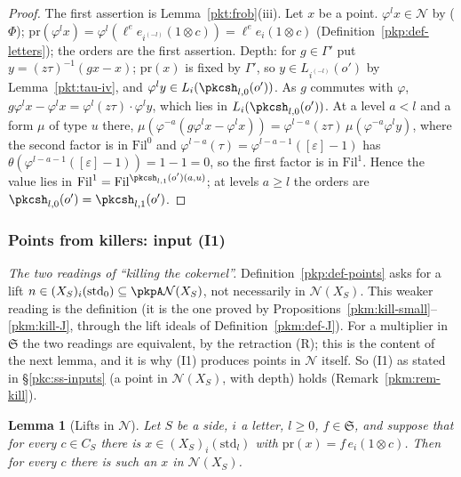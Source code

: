 \documentclass[10pt]{amsart}
\newtheorem{lemma}[theorem]{Lemma}
\theoremstyle{definition}
\theoremstyle{remark}
\begin{document}
\begin{proof}
The first assertion is Lemma~\ref{pkt:frob}(iii). Let $x$ be a point. $\varphi^lx\in\mathcal N$ by ($\Phi$);
$\mathrm{pr}(\varphi^lx)=\varphi^l(\ell^ee_{i^{(-l)}}(1\otimes c))=\ell^ee_i(1\otimes c)$
(Definition~\ref{pkp:def-letters}); the orders are the first assertion. Depth: for $g\in\Gamma'$ put $y=
(z\tau)^{-1}(gx-x)$; $\mathrm{pr}(x)$ is fixed by $\Gamma'$, so $y\in L_{i^{(-l)}}(o')$ by
Lemma~\ref{pkt:tau-iv}, and $\varphi^ly\in L_i(\pkcsh_{l,0}(o'))$. As $g$ commutes with $\varphi$,
$g\varphi^lx-\varphi^lx=\varphi^l(z\tau)\cdot\varphi^ly$, which lies in $L_i(\pkcsh_{l,0}(o'))$. At a level $a<l$
and a form $\mu$ of type $u$ there, $\mu(\varphi^{-a}(g\varphi^lx-\varphi^lx))=\varphi^{l-a}(z\tau)\,
\mu(\varphi^{-a}\varphi^ly)$, where the second factor is in $\mathrm{Fil}^0$ and $\varphi^{l-a}(\tau)=
\varphi^{l-a-1}([\varepsilon]-1)$ has $\theta(\varphi^{l-a-1}([\varepsilon]-1))=1-1=0$, so the first factor is in
$\mathrm{Fil}^1$. Hence the value lies in $\mathrm{Fil}^1=\mathrm{Fil}^{\pkcsh_{l,1}(o')(a,u)}$; at levels $a\ge l$
the orders are $\pkcsh_{l,0}(o')=\pkcsh_{l,1}(o')$.
\end{proof}

\subsubsection{Points from killers: input (I1)}\label{pkt:ss-I1}

\emph{The two readings of ``killing the cokernel''.} Definition~\ref{pkp:def-points} asks for a lift
$n\in(X_S)_i(\mathrm{std}_0)\subseteq\pkpA\mathcal N(X_S)$, not necessarily in $\mathcal N(X_S)$. This
weaker reading is the definition (it is the one
proved by Propositions~\ref{pkm:kill-small}--\ref{pkm:kill-J}, through the lift ideals of
Definition~\ref{pkm:def-J}). For a multiplier in $\mathfrak S$ the two readings are equivalent, by the
retraction (R); this is the content of the next lemma, and it is why (I1) produces points in $\mathcal N$
itself. So (I1) as stated in \S\ref{pkc:ss-inputs} (a point in $\mathcal N(X_S)$, with depth) holds
(Remark~\ref{pkm:rem-kill}).

\begin{lemma}[Lifts in $\mathcal N$]\label{pkt:lift}
Let $S$ be a side, $i$ a letter, $l\ge0$, $f\in\mathfrak S$, and suppose that for every $c\in C_S$ there is
$x\in(X_S)_i(\mathrm{std}_l)$ with $\mathrm{pr}(x)=f\,e_i(1\otimes c)$. Then for every $c$ there is such an $x$
in $\mathcal N(X_S)$.
\end{lemma}
\end{document}
